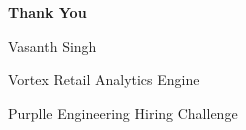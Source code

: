 \documentclass[aspectratio=169, 11pt]{beamer}
\begin{document}
\begin{frame}
  \centering
  \vspace{2cm}
  {\Huge\bfseries\color{teal} Thank You}

  \vspace{1cm}
  {\Large Vasanth Singh}

  \vspace{0.5cm}
  {\large\color{gray} Vortex Retail Analytics Engine}

  \vspace{0.3cm}
  {\small\color{gray} Purplle Engineering Hiring Challenge}
\end{frame}
\end{document}

